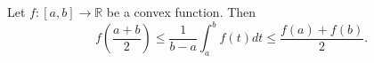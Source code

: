 \documentclass[12pt]{article}
\begin{document}
Let $f: [a,b] \to \mathbb{R}$ be a convex function.
Then
$$
f(\frac{a+b}{2}) \le \frac{1}{b-a} \int_a^b f(t) dt \le \frac{f(a)+f(b)}{2}.
$$

\end{document}
